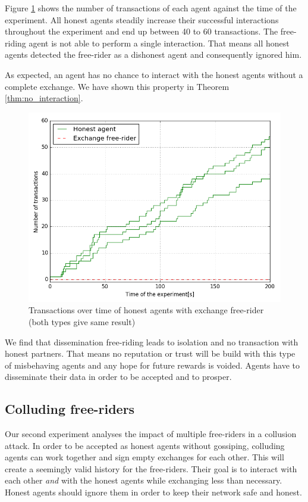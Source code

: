 Figure \ref{fig:DFR_no_exchanges} shows the number of transactions of each 
agent against the time of the experiment. All honest agents steadily increase their successful 
interactions throughout the experiment and end up between 40 to 60 transactions. The free-riding agent
is not able to perform a single interaction. That means all honest agents detected the free-rider 
as a dishonest agent and consequently ignored him. 

As expected, an agent has no chance to interact with the honest agents without a complete exchange. 
We have shown this property in Theorem \ref{thm:no_interaction}.


\begin{figure}
  \centering
  \includegraphics[width=.6\linewidth]{images/gossip_free-rider}
  \caption{Transactions over time of honest agents with exchange free-rider (both types give same result)}
  \label{fig:DFR_no_exchanges}
\end{figure}



We find that dissemination free-riding leads to isolation and no transaction with honest partners. 
That means no reputation or trust will be build with this type of misbehaving agents and any hope for
future rewards is voided. Agents have to disseminate their data in order to be accepted and to prosper.

\subsection{Colluding free-riders}
Our second experiment analyses the impact of multiple free-riders in a collusion attack. In order to
be accepted as honest agents without gossiping, colluding agents can work together and sign empty exchanges for 
each other. This will create a seemingly valid history for the free-riders. Their goal is to interact 
with each other \textit{and} with the honest agents while exchanging less than necessary. Honest agents
should ignore them in order to keep their network safe and honest.

